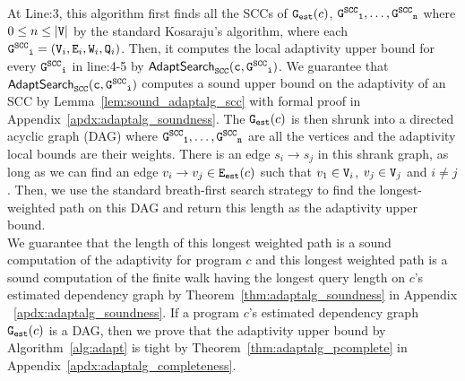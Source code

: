  At Line:3, this algorithm first finds all the SCCs of $\mathtt{{G_{est}}}(c)$, $\mathtt{\mathtt{G^{SCC}}_1}, \ldots, \mathtt{\mathtt{G^{SCC}}_n}$
 where $0 \leq n \leq |\mathtt{V}|$ by the standard Kosaraju’s algorithm, where each
 $\mathtt{\mathtt{G^{SCC}}_i} = (\mathtt{V}_i, \mathtt{E}_i, \mathtt{W}_i, \mathtt{Q}_i)$.
 Then, 
 it computes the local adaptivity upper bound for every $\mathtt{\mathtt{G^{SCC}}_i}$
 in line:4-5 by $\mathtt{\mathsf{AdaptSearch}_{SCC}(c, \mathtt{G^{SCC}}_i)}$.
 We guarantee that $\mathtt{\mathsf{AdaptSearch}_{SCC}(c, \mathtt{G^{SCC}}_i)}$ computes a sound upper bound on the adaptivity of an SCC by Lemma~\ref{lem:sound_adaptalg_scc} with formal proof in Appendix~\ref{apdx:adaptalg_soundness}.
 The $\mathtt{{G_{est}}}(c)$ is then shrunk into a directed acyclic graph (DAG) where 
 $\mathtt{\mathtt{G^{SCC}}_1}, \ldots, \mathtt{\mathtt{G^{SCC}}_n}$ are all the vertices and the adaptivity local bounds are their weights.
 There is an edge $s_i \to s_j$ in this shrank graph, as long as we can find an edge $v_i \to v_j \in \mathtt{{E_{est}}}(c)$ such that $v_1 \in \mathtt{V}_i$, $v_j \in \mathtt{V}_j$ and $i \neq j$.
 Then, we use the standard breath-first search strategy to find the longest-weighted path
 on this DAG and return this length as the adaptivity upper bound.
 \\
 We guarantee that 
 the length of this longest weighted path is a sound computation of the adaptivity for program $c$
 and this longest weighted path is a sound computation of the finite walk having the longest query length 
 on $c$'s estimated dependency graph by Theorem~\ref{thm:adaptalg_soundness}
 in Appendix
 ~\ref{apdx:adaptalg_soundness}.
If a program
$c$'s estimated dependency graph $\mathtt{{G_{est}}}(c)$ is a DAG, then we prove that the adaptivity upper bound by Algorithm~\ref{alg:adapt} is tight by Theorem~\ref{thm:adaptalg_pcomplete} in Appendix~\ref{apdx:adaptalg_completeness}.

